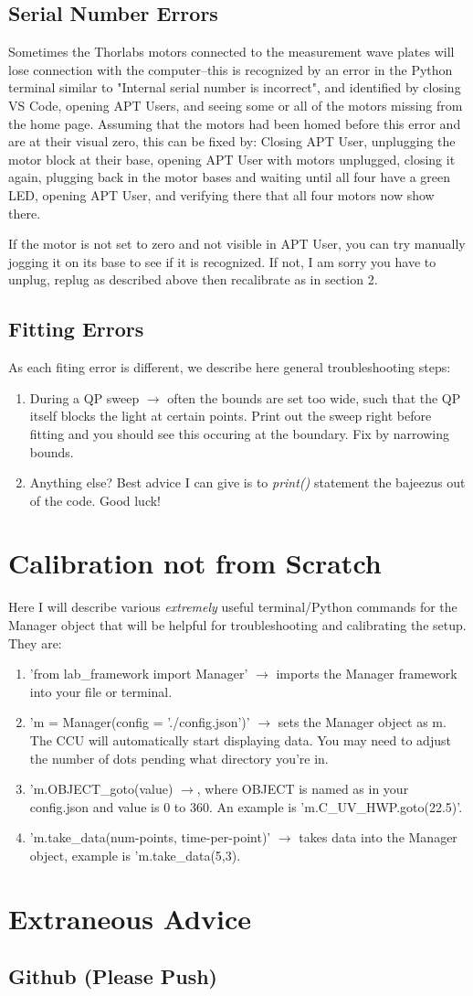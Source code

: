 \documentclass{paper}[11pt]
\begin{document}
\subsection{Serial Number Errors}
Sometimes the Thorlabs motors connected to the measurement wave plates will lose connection with the computer--this is recognized by an error in the Python terminal similar to "Internal serial number is incorrect", and identified by closing VS Code, opening APT Users, and seeing some or all of the motors missing from the home page. Assuming that the motors had been homed before this error and are at their visual zero, this can be fixed by: Closing APT User, unplugging the motor block at their base, opening APT User with motors unplugged, closing it again, plugging back in the motor bases and waiting until all four have a green LED, opening APT User, and verifying there that all four motors now show there. 

If the motor is not set to zero and not visible in APT User, you can try manually jogging it on its base to see if it is recognized. If not, I am sorry you have to unplug, replug as described above then recalibrate as in section 2.
\subsection{Fitting Errors}
As each fiting error is different, we describe here general troubleshooting steps:
\begin{enumerate}
    \item During a QP sweep $\rightarrow$ often the bounds are set too wide, such that the QP itself blocks the light at certain points. Print out the sweep right before fitting and you should see this occuring at the boundary. Fix by narrowing bounds.
    \item Anything else? Best advice I can give is to \textit{print()} statement the bajeezus out of the code. Good luck!
\end{enumerate}
\section{Calibration not from Scratch}
Here I will describe various \textit{extremely} useful terminal/Python commands for the Manager object that will be helpful for troubleshooting and calibrating the setup. They are:
\begin{enumerate}
    \item 'from lab\_framework import Manager' $\rightarrow$ imports the Manager framework into your file or terminal.
    \item 'm = Manager(config = './config.json')' $\rightarrow$ sets the Manager object as m. The CCU will automatically start displaying data. You may need to adjust the number of dots pending what directory you're in.  
    \item 'm.OBJECT\_goto(value) $\rightarrow$, where OBJECT is named as in your config.json and value is 0 to 360. An example is 'm.C\_UV\_HWP.goto(22.5)'.
    \item 'm.take_data(num-points, time-per-point)' $\rightarrow$ takes data into the Manager object, example is 'm.take_data(5,3).
\end{enumerate}
\section{Extraneous Advice}
\subsection{Github (Please Push)}
\end{document}
